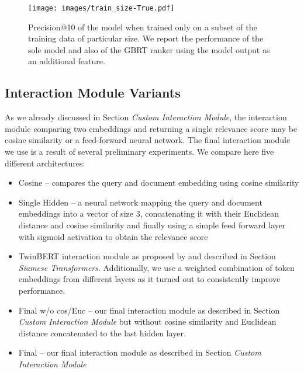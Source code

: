\documentclass[letterpaper]{article} \usepackage{aaai22 }  \usepackage{times}  \usepackage{helvet}  \usepackage{courier}  \usepackage[hyphens]{url}  \usepackage{graphicx} \usepackage{amsmath,amsfonts,amssymb, mathabx,bm,bbm}
\begin{document}
\begin{figure}[!htb]
    \centering
    \texttt{[image: images/train\_size-True.pdf]}    
    \caption{Precision@10 of the model when trained only on a subset of the training data of particular size. We report the performance of the sole model and also of the GBRT ranker using the model output as an additional feature.} \label{figure_train_size}
\end{figure}

\subsection{Interaction Module Variants}

As we already discussed in Section \textit{Custom Interaction Module}, the interaction module comparing two embeddings and returning a single relevance score may be cosine similarity or a feed-forward neural network. The final interaction module we use is a result of several preliminary experiments. We compare here five different architectures: 
\begin{itemize}
    \item Cosine -- compares the query and document embedding using cosine similarity
    \item Single Hidden -- a neural network mapping the query and document embeddings into a vector of size 3, concatenating it with their Euclidean distance and cosine similarity and finally using a simple feed forward layer with sigmoid activation to obtain the relevance score
    \item TwinBERT interaction module as proposed by \citet{twinbert} and described in Section \textit{Siamese Transformers}. Additionally, we use a weighted combination of token embeddings from different layers as it turned out to consistently improve performance.
    \item Final w/o cos/Euc -- our final interaction module as described in Section \textit{Custom Interaction Module} but without cosine similarity and Euclidean distance concatenated to the last hidden layer.
    \item Final -- our final interaction module as described in Section \textit{Custom Interaction Module}
\end{itemize}
\end{document}
